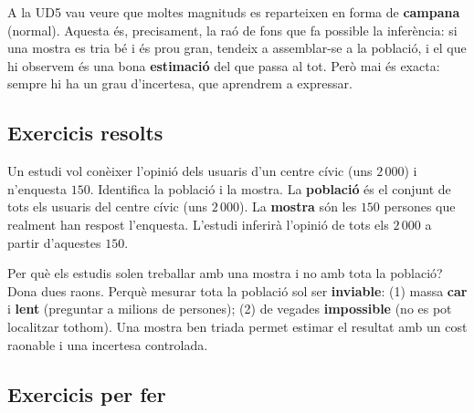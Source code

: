 \begin{exemple}
A la UD5 vau veure que moltes magnituds es reparteixen en forma de \textbf{campana}
(normal). Aquesta és, precisament, la raó de fons que fa possible la inferència: si una
mostra es tria bé i és prou gran, tendeix a assemblar-se a la població, i el que hi
observem és una bona \textbf{estimació} del que passa al tot. Però mai és exacta: sempre
hi ha un grau d'incertesa, que aprendrem a expressar.
\end{exemple}

\subsection{Exercicis resolts}

\begin{exresolt}
Un estudi vol conèixer l'opinió dels usuaris d'un centre cívic (uns $2\,000$) i n'enquesta
$150$. Identifica la població i la mostra.
\solucio
La \textbf{població} és el conjunt de tots els usuaris del centre cívic (uns $2\,000$). La
\textbf{mostra} són les $150$ persones que realment han respost l'enquesta. L'estudi
inferirà l'opinió de tots els $2\,000$ a partir d'aquestes $150$.
\end{exresolt}

\begin{exresolt}
Per què els estudis solen treballar amb una mostra i no amb tota la població? Dona dues
raons.
\solucio
Perquè mesurar tota la població sol ser \textbf{inviable}: (1) massa \textbf{car} i
\textbf{lent} (preguntar a milions de persones); (2) de vegades \textbf{impossible}
(no es pot localitzar tothom). Una mostra ben triada permet estimar el resultat amb un cost
raonable i una incertesa controlada.
\end{exresolt}

\subsection{Exercicis per fer}


